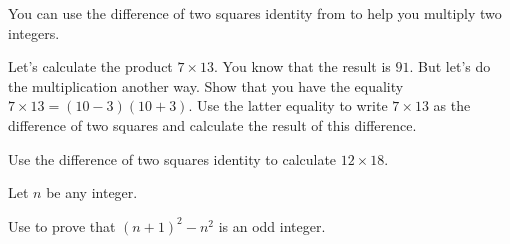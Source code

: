 \documentclass[a4paper,oneside,12pt]{article}
\begin{document}
\begin{problem}
\item You can use the difference of two squares identity from
   to help you
  multiply two integers.
  \begin{packedenum}
  \item\label{subprob:quadroots:difference_two_squares_7_13}
    Let's calculate the product $7 \times 13$.  You know that the
    result is $91$.  But let's do the multiplication another way.
    Show that you have the equality $7 \times 13 = (10 - 3) (10 + 3)$.
    Use the latter equality to write $7 \times 13$ as the difference
    of two squares and calculate the result of this difference.

  \item\label{subprob:quadroots:difference_two_squares_12_18}
    Use the difference of two squares identity to calculate
    $12 \times 18$.
  \end{packedenum}

\item Let $n$ be any integer.
  \begin{packedenum}
  \item\label{subprob:quadroots:difference_two_consecutive_squares}
    Use  to prove
    that $(n + 1)^2 - n^2$ is an odd integer.


\end{packedenum}
\end{problem}
\end{document}
